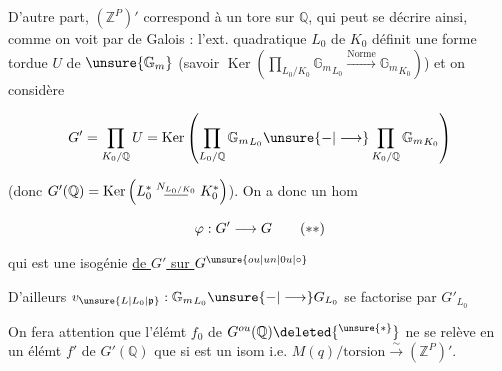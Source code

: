 

D'autre part, $(\mathbb Z^P)'$ correspond à
un tore sur $\mathbb Q$, qui peut se décrire ainsi, comme
on voit par  de Galois : l'ext. quadratique
$L_0$ de $K_0$ définit une forme tordue
$U$ de $\unsure{\mathbb G_m}$ (savoir $\operatorname{Ker}\left(\prod_{L_0/K_0}{\mathbb G_m}_{L_0}\xrightarrow{\text{Norme}}{\mathbb G_m}_{K_0}\right)$)
et on considère 

\[
G'=\prod_{K_0/\mathbb Q}U=\operatorname{Ker}\left(\prod_{L_0/\mathbb Q}{\mathbb G_m}_{L_0}\unsure{-|\longrightarrow}\prod_{K_0/\mathbb Q}{\mathbb G_m}_{K_0}\right)
\]

(donc $G'(\mathbb Q)=\operatorname{Ker}\left(L_0^*\mathrel{\overset{N_{L_0/K_0}}{\rule{1.7em}{.4pt}}}K_0^*\right)$). On
a donc un hom

\[
\varphi:G'\longrightarrow G\tag*{(\ensuremath{**})}
\]

qui est une isogénie \uline{de $G'$ sur $G^{\unsure{ou|un|0u|\circ}}$}

D'ailleurs $v_{\unsure{L|L_0|\mathfrak p}}:{\mathbb G_m}_{L_0}\unsure{-|\longrightarrow}G_{L_0}$ se factorise
par $G'_{L_0}$


On fera attention que l'élémt $f_0$  de $G^{ou}(\mathbb Q)\deleted{{}^{\unsure{*}}}$
ne se relève en un élémt  $f'$ de $G'(\mathbb Q)$ que
si \inserted{$\varphi$} est un isom i.e. $M(q)/\mathrm{torsion}\xrightarrow{\sim}(\mathbb Z^P)'$.

